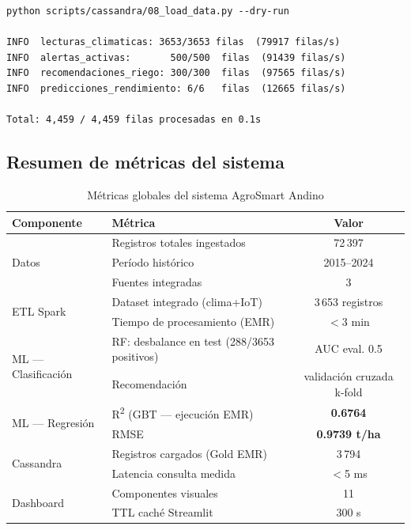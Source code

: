 \documentclass[12pt,a4paper]{article}
\begin{document}
\begin{lstlisting}[style=bashstyle, caption={Salida del dry-run de carga Cassandra (local)}]
python scripts/cassandra/08_load_data.py --dry-run

INFO  lecturas_climaticas: 3653/3653 filas  (79917 filas/s)
INFO  alertas_activas:       500/500  filas  (91439 filas/s)
INFO  recomendaciones_riego: 300/300  filas  (97565 filas/s)
INFO  predicciones_rendimiento: 6/6   filas  (12665 filas/s)

Total: 4,459 / 4,459 filas procesadas en 0.1s
\end{lstlisting}

\subsection{Resumen de métricas del sistema}

\begin{table}[H]
\centering
\caption{Métricas globales del sistema AgroSmart Andino}
\label{tab:metricas}
\begin{tabular}{llc}
\toprule
\textbf{Componente} & \textbf{Métrica} & \textbf{Valor} \\
\midrule
\multirow{3}{*}{Datos}
  & Registros totales ingestados & 72\,397 \\
  & Período histórico & 2015--2024 \\
  & Fuentes integradas & 3 \\
\midrule
\multirow{2}{*}{ETL Spark}
  & Dataset integrado (clima+IoT) & 3\,653 registros \\
  & Tiempo de procesamiento (EMR) & $<$3 min \\
\midrule
\multirow{2}{*}{ML — Clasificación}
  & RF: desbalance en test (288/3653 positivos) & AUC eval. 0.5 \\
  & Recomendación & validación cruzada k-fold \\
\midrule
\multirow{2}{*}{ML — Regresión}
  & R\textsuperscript{2} (GBT — ejecución EMR) & \textbf{0.6764} \\
  & RMSE & \textbf{0.9739 t/ha} \\
\midrule
\multirow{2}{*}{Cassandra}
  & Registros cargados (Gold EMR) & 3\,794 \\
  & Latencia consulta medida & $<$5 ms \\
\midrule
\multirow{2}{*}{Dashboard}
  & Componentes visuales & 11 \\
  & TTL caché Streamlit & 300 s \\
\bottomrule
\end{tabular}
\end{table}
\end{document}

